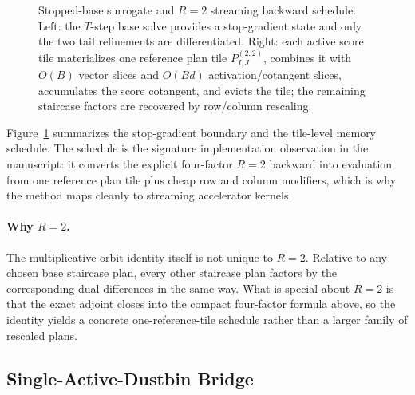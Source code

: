 \begin{figure}[h]
{
    }
    \caption{Stopped-base surrogate and $R=2$ streaming backward schedule. Left: the $T$-step base solve provides a stop-gradient state and only the two tail refinements are differentiated. Right: each active score tile materializes one reference plan tile $P^{(2,2)}_{I,J}$, combines it with $O(B)$ vector slices and $O(Bd)$ activation/cotangent slices, accumulates the score cotangent, and evicts the tile; the remaining staircase factors are recovered by row/column rescaling.}
    \label{fig:staircase}
\end{figure}

Figure~\ref{fig:staircase} summarizes the stop-gradient boundary and the tile-level memory schedule. The schedule is the signature implementation observation in the manuscript: it converts the explicit four-factor $R=2$ backward into evaluation from one reference plan tile plus cheap row and column modifiers, which is why the method maps cleanly to streaming accelerator kernels.

\paragraph{Why \texorpdfstring{$R=2$}{R=2}.}
The multiplicative orbit identity itself is not unique to $R=2$. Relative to any chosen base staircase plan, every other staircase plan factors by the corresponding dual differences in the same way. What is special about $R=2$ is that the exact adjoint closes into the compact four-factor formula above, so the identity yields a concrete one-reference-tile schedule rather than a larger family of rescaled plans.

\subsection{Single-Active-Dustbin Bridge}

